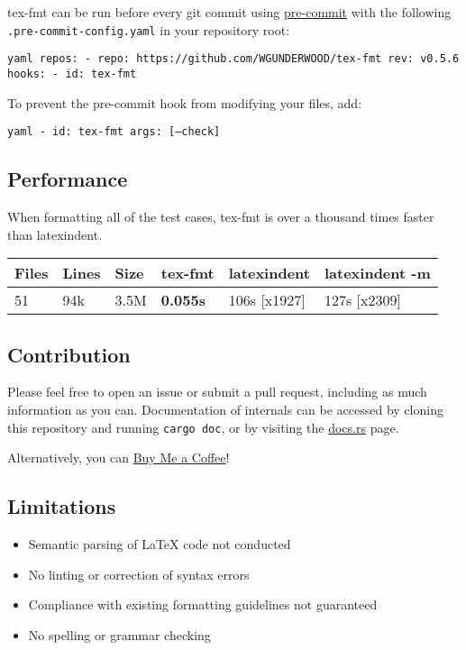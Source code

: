 \documentclass{scrartcl}
\begin{document}
tex-fmt can be run before every git commit using
\href{http://pre-commit.com}{pre-commit} with the following
\texttt{.pre-commit-config.yaml} in your repository root:

\texttt{yaml
repos:
  - repo: https://github.com/WGUNDERWOOD/tex-fmt
    rev: v0.5.6
    hooks:
      - id: tex-fmt
}

To prevent the pre-commit hook from modifying your files, add:

\texttt{yaml
      - id: tex-fmt
        args: {[}--check{]}
}

\subsection{Performance}\hypertarget{performance}{}\label{performance}

When formatting all of the test cases,
tex-fmt is over a thousand times faster than latexindent.

\begin{longtable}{|l|l|l|l|l|l|}
\hline
\textbf{Files} & \textbf{Lines} & \textbf{Size} & \textbf{tex-fmt} & \textbf{latexindent} & \textbf{latexindent -m}\\
\hline
51 & 94k & 3.5M & \textbf{0.055s} & 106s {[}x1927{]} & 127s {[}x2309{]}\\
\hline
\end{longtable}

\subsection{Contribution}\hypertarget{contribution}{}\label{contribution}

Please feel free to open an issue or submit a pull request,
including as much information as you can. Documentation of internals
can be accessed by cloning this repository and running \texttt{cargo doc},
or by visiting the \href{https://docs.rs/tex-fmt/latest/tex_fmt/}{docs.rs} page.

Alternatively, you can
\href{https://buymeacoffee.com/wgunderwood}{Buy Me a Coffee}!

\subsection{Limitations}\hypertarget{limitations}{}\label{limitations}

\begin{itemize}
\item{} Semantic parsing of LaTeX code not conducted
\item{} No linting or correction of syntax errors
\item{} Compliance with existing formatting guidelines not guaranteed
\item{} No spelling or grammar checking
\end{itemize}
\end{document}
